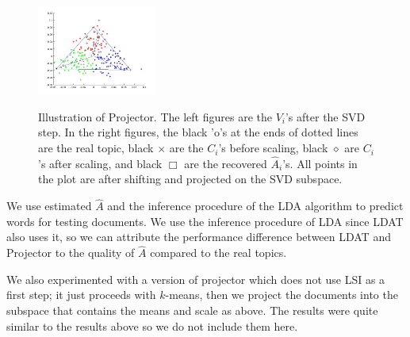 \begin{figure}[h]
\begin{center}
{            \includegraphics[width=0.35\textwidth]{b2.jpg}
        }

    \end{center}
    \caption{Illustration of Projector. The left figures are the $V_i$'s after the SVD step. In the right figures, the black 'o's at the ends of dotted lines are the real topic, black $\times$ are the $C_i$'s before scaling, black $\diamond$ are $C_i$'s after scaling, and black $\Box$ are the recovered $\hat{A}_i$'s. All points in the plot are after shifting and projected on the SVD subspace. }
\label{fig:projectorVis}
\end{figure}


We use estimated $\hat{A}$ and the inference procedure of the LDA
algorithm to predict words for testing documents. We use the inference
procedure of LDA since LDAT also uses it, so we can attribute
the performance difference between LDAT and Projector to the quality
of $\hat{A}$ compared to the real topics.

We also experimented with a version of projector which does
not use LSI as a first step; it just proceeds
with $k$-means, then we project the documents into the subspace
that contains the means and scale as above.  The results
were quite similar to the results above so we do not
include them here. 


